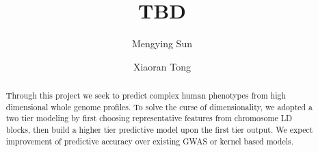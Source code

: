 \documentclass[acmtog, authorversion]{acmart}
\begin{document}
\title{TBD}
\author{Mengying Sun}
\author{Xiaoran Tong}

\renewcommand\shortauthors{Zhou, G. et al}

\begin{abstract}
  Through this project we seek to predict complex human phenotypes from high dimensional whole genome profiles. To solve the curse of dimensionality, we adopted a two tier modeling by first choosing representative features from chromosome LD blocks, then build a higher tier predictive model upon the first tier output. We expect improvement of predictive accuracy over existing GWAS or kernel based models.
\end{abstract}


%
%

\end{document}
